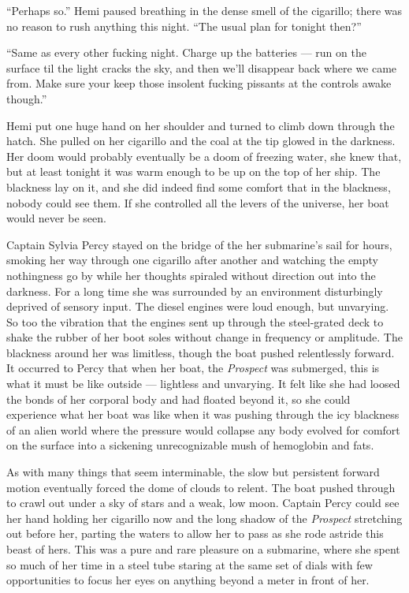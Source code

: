 \documentclass[]{scrbook}
\begin{document}
``Perhaps so.'' Hemi paused breathing in the dense smell of the
cigarillo; there was no reason to rush anything this night. ``The usual
plan for tonight then?''

``Same as every other fucking night. Charge up the batteries --- run on
the surface til the light cracks the sky, and then we'll disappear back
where we came from. Make sure your keep those insolent fucking pissants
at the controls awake though.''

Hemi put one huge hand on her shoulder and turned to climb down through
the hatch. She pulled on her cigarillo and the coal at the tip glowed in
the darkness. Her doom would probably eventually be a doom of freezing
water, she knew that, but at least tonight it was warm enough to be up
on the top of her ship. The blackness lay on it, and she did indeed find
some comfort that in the blackness, nobody could see them. If she
controlled all the levers of the universe, her boat would never be seen.

Captain Sylvia Percy stayed on the bridge of the her submarine's sail
for hours, smoking her way through one cigarillo after another and
watching the empty nothingness go by while her thoughts spiraled without
direction out into the darkness. For a long time she was surrounded by
an environment disturbingly deprived of sensory input. The diesel
engines were loud enough, but unvarying. So too the vibration that the
engines sent up through the steel-grated deck to shake the rubber of her
boot soles without change in frequency or amplitude. The blackness
around her was limitless, though the boat pushed relentlessly forward.
It occurred to Percy that when her boat, the \emph{Prospect} was
submerged, this is what it must be like outside --- lightless and
unvarying. It felt like she had loosed the bonds of her corporal body
and had floated beyond it, so she could experience what her boat was
like when it was pushing through the icy blackness of an alien world
where the pressure would collapse any body evolved for comfort on the
surface into a sickening unrecognizable mush of hemoglobin and fats.

As with many things that seem interminable, the slow but persistent
forward motion eventually forced the dome of clouds to relent. The boat
pushed through to crawl out under a sky of stars and a weak, low moon.
Captain Percy could see her hand holding her cigarillo now and the long
shadow of the \emph{Prospect} stretching out before her, parting the
waters to allow her to pass as she rode astride this beast of hers. This
was a pure and rare pleasure on a submarine, where she spent so much of
her time in a steel tube staring at the same set of dials with few
opportunities to focus her eyes on anything beyond a meter in front of
her.
\end{document}
